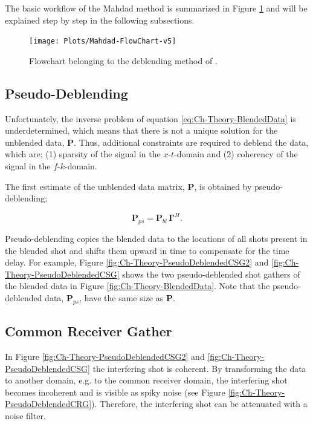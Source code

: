 The basic workflow of the Mahdad method is summarized in Figure \ref{fig:Ch-Theory-FlowChart} and will be explained step by step in the following subsections. 

\begin{figure}
	\centering
	\texttt{[image: Plots/Mahdad-FlowChart-v5]}
	\caption{Flowchart belonging to the deblending method of \citet{Mahdad-Deblending-Method}.}
	\label{fig:Ch-Theory-FlowChart}
\end{figure}

\subsection{Pseudo-Deblending}

Unfortunately, the inverse problem of equation \ref{eq:Ch-Theory-BlendedData} is underdetermined, which means that there is not a unique solution for the unblended data, $\mathbf{P}$. Thus, additional constraints are required to deblend the data, which are; (1) sparsity of the signal in the $x$-$t$-domain and (2) coherency of the signal in the $f$-$k$-domain. 

The first estimate of the unblended data matrix, $\mathbf{P}$, is obtained by pseudo-deblending;

\begin{equation}
	\mathbf{P}_{ps} = \mathbf{P}_{bl} \, \mathbf{\Gamma}^H.
	\label{eq:Ch-Theory-PseudoDeblended}
\end{equation}

Pseudo-deblending copies the blended data to the locations of all shots present in the blended shot and shifts them  upward in time to compensate for the time delay. For example, Figure \ref{fig:Ch-Theory-PseudoDeblendedCSG2} and \ref{fig:Ch-Theory-PseudoDeblendedCSG} shows the two pseudo-deblended shot gathers of the blended data in Figure \ref{fig:Ch-Theory-BlendedData}. Note that the pseudo-deblended data, $\mathbf{P}_{ps}$, have the same size as $\mathbf{P}$.


\subsection{Common Receiver Gather}

In Figure \ref{fig:Ch-Theory-PseudoDeblendedCSG2} and \ref{fig:Ch-Theory-PseudoDeblendedCSG} the interfering shot is coherent. By transforming the data to another domain, e.g. to the common receiver domain, the interfering shot becomes incoherent  and is visible as spiky noise (see Figure \ref{fig:Ch-Theory-PseudoDeblendedCRG}). Therefore, the interfering shot can be attenuated with a noise filter. 

